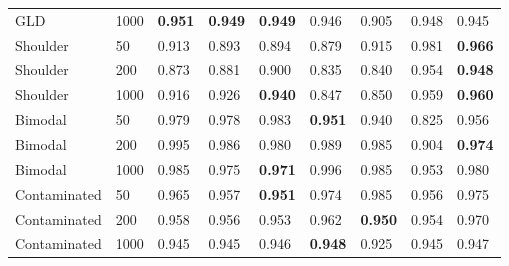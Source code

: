 \begin{tabular}{lllllllll}
GLD & 1000 & \textbf{0.951} & \textbf{0.949} & \textbf{0.949} & 0.946 & 0.905 & 0.948 & 0.945 \\
Shoulder & 50 & 0.913 & 0.893 & 0.894 & 0.879 & 0.915 & 0.981 & \textbf{0.966} \\
Shoulder & 200 & 0.873 & 0.881 & 0.900 & 0.835 & 0.840 & 0.954 & \textbf{0.948} \\
Shoulder & 1000 & 0.916 & 0.926 & \textbf{0.940} & 0.847 & 0.850 & 0.959 & \textbf{0.960} \\
Bimodal & 50 & 0.979 & 0.978 & 0.983 & \textbf{0.951} & 0.940 & 0.825 & 0.956 \\
Bimodal & 200 & 0.995 & 0.986 & 0.980 & 0.989 & 0.985 & 0.904 & \textbf{0.974} \\
Bimodal & 1000 & 0.985 & 0.975 & \textbf{0.971} & 0.996 & 0.985 & 0.953 & 0.980 \\
Contaminated & 50 & 0.965 & 0.957 & \textbf{0.951} & 0.974 & 0.985 & 0.956 & 0.975 \\
Contaminated & 200 & 0.958 & 0.956 & 0.953 & 0.962 & \textbf{0.950} & 0.954 & 0.970 \\
Contaminated & 1000 & 0.945 & 0.945 & 0.946 & \textbf{0.948} & 0.925 & 0.945 & 0.947 \\
\bottomrule
\end{tabular}

